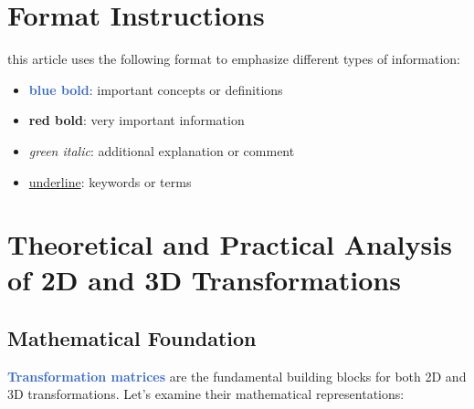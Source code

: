\documentclass[12pt]{article}
\begin{document}


\section*{Format Instructions}
this article uses the following format to emphasize different types of information:
\begin{itemize}
    \item \textcolor{highlight}{\textbf{blue bold}}: important concepts or definitions
    \item \textcolor{important}{\textbf{red bold}}: very important information
    \item \textcolor{note}{\textit{green italic}}: additional explanation or comment
    \item \underline{underline}: keywords or terms
\end{itemize}


\section{Theoretical and Practical Analysis of 2D and 3D Transformations}\label{sec:transformations}

\subsection{Mathematical Foundation}

\textcolor{highlight}{\textbf{Transformation matrices}} are the fundamental building blocks for both 2D and 3D transformations. Let's examine their mathematical representations:
\end{document}
